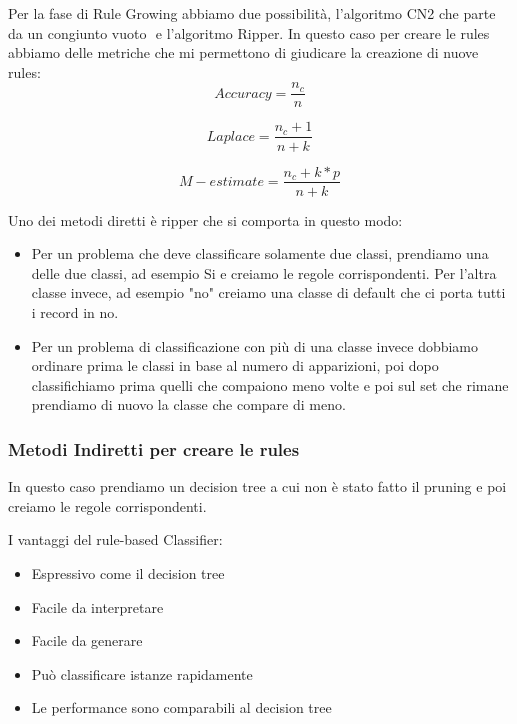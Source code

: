 \documentclass[14pt]{extreport}
\begin{document}
Per la fase di Rule Growing abbiamo due possibilità, l'algoritmo CN2 che parte da un congiunto vuoto ${}$ e l'algoritmo Ripper.
In questo caso per creare le rules abbiamo delle metriche che mi permettono di giudicare la creazione di nuove rules:
\begin{equation}
    Accuracy = \frac{n_c}{n}
\end{equation}

\begin{equation}
    Laplace = \frac{n_c + 1}{n + k}
\end{equation}

\begin{equation}
    M-estimate = \frac{n_c + k*p}{n + k}
\end{equation}

Uno dei metodi diretti è ripper che si comporta in questo modo:
\begin{itemize}
    \item Per un problema che deve classificare solamente due classi, prendiamo una delle due classi, ad esempio Si e creiamo le regole corrispondenti. Per l'altra classe invece, ad esempio "no" creiamo una classe di default che ci porta tutti i record in no.
    \item Per un problema di classificazione con più di una classe invece dobbiamo ordinare prima le classi in base al numero di apparizioni, poi dopo classifichiamo prima quelli che compaiono meno volte e poi sul set che rimane prendiamo di nuovo la classe che compare di meno.
\end{itemize}

\subsubsection{Metodi Indiretti per creare le rules}

In questo caso prendiamo un decision tree a cui non è stato fatto il pruning e poi creiamo le regole corrispondenti.

I vantaggi del rule-based Classifier:
\begin{itemize}
    \item Espressivo come il decision tree
    \item Facile da interpretare
    \item Facile da generare
    \item Può classificare istanze rapidamente
    \item Le performance sono comparabili al decision tree
\end{itemize}
\end{document}
